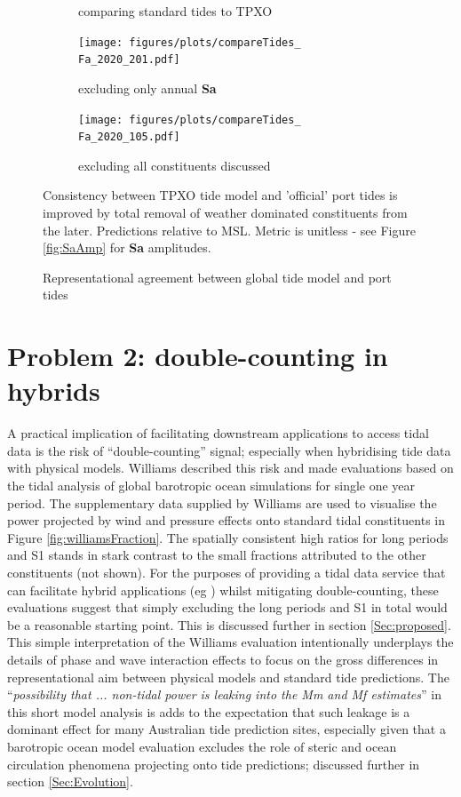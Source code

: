 \begin{figure}[!hbt]
\begin{subfigure}[b]{\figwidthThird}
        \caption{\Fname{} comparing standard tides to TPXO}
    \end{subfigure}
    \hfill{}
    \begin{subfigure}[b]{\figwidthThird}
        \texttt{[image: figures/plots/compareTides\_\\Fa\_2020\_201.pdf]} 
        \caption{\Fname{} excluding only annual \textbf{Sa}}
    \end{subfigure}
    \hfill{}
    \begin{subfigure}[b]{\figwidthThird}
        \texttt{[image: figures/plots/compareTides\_\\Fa\_2020\_105.pdf]} 
        \caption{\Fname{} excluding all constituents discussed}
    \end{subfigure}
    
    \caption{Representational agreement between global tide model and port tides}
    {Consistency between TPXO tide model and 'official' port tides is improved by total removal of weather dominated constituents from the later.   Predictions relative to MSL.  Metric is unitless - see Figure \ref{fig:SaAmp} for \textbf{Sa} amplitudes.}
    \label{fig:improveOtps}
\end{figure}   


\section{Problem 2: double-counting in hybrids}
\label{Sec:DoubleCount}
A practical implication of facilitating downstream applications to access tidal data is the risk of ``double-counting'' signal; especially when hybridising tide data with physical models. 
Williams \citep{10.5194/os-2020-107} described this risk and made evaluations based on the tidal analysis of global barotropic ocean simulations for single one year period. 
The supplementary data supplied by Williams are used to visualise the power projected by wind and pressure effects onto standard tidal constituents in Figure \ref{fig:williamsFraction}.  The spatially consistent high ratios for long periods and S1 stands in stark contrast to the small fractions attributed to the other constituents (not shown).    
For the purposes of providing a tidal data service that can facilitate hybrid applications (eg \citep{Taylor:2017coa}) whilst mitigating double-counting, these evaluations suggest that simply excluding the long periods and S1 in total would be a reasonable starting point.   This is discussed further in  section \ref{Sec:proposed}.
This simple interpretation of the Williams evaluation intentionally underplays the details of phase and wave interaction effects to focus on the gross differences in representational aim between physical models and standard tide predictions. 
The ``\textit{possibility that ... non-tidal power is leaking into the Mm and Mf estimates}'' in this short model analysis is adds to the expectation that such leakage is a dominant effect for many Australian tide prediction sites, especially given that a barotropic ocean model evaluation excludes the role of steric and ocean circulation phenomena projecting onto tide predictions; discussed further in section \ref{Sec:Evolution}.

